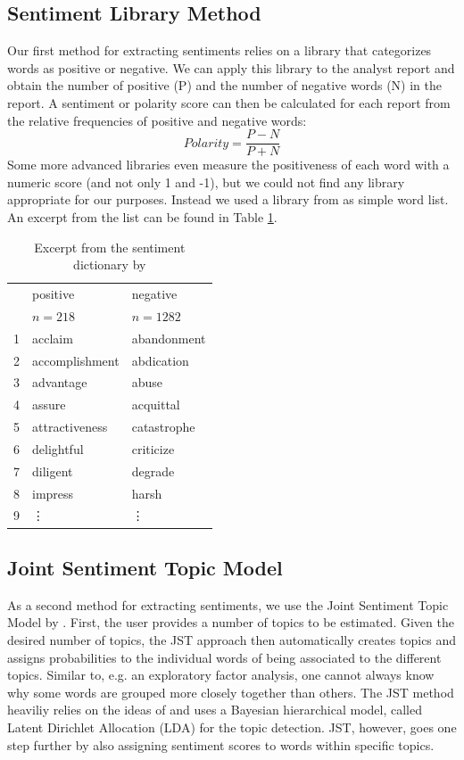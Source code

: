 \subsection{Sentiment Library Method}\label{BoW}
Our first method for extracting sentiments relies on a library that categorizes words as positive or negative. We can apply this library to the analyst report and obtain the number of positive (P) and the number of negative words (N) in the report. A sentiment or polarity score can then be calculated for each report from the relative frequencies of positive and negative words: 
\begin{equation}
    Polarity = \frac{P - N}{P + N}
\end{equation}\label{eq:polarity}
Some more advanced libraries even measure the positiveness of each word with a numeric score (and not only 1 and -1), but we could not find any library appropriate for our purposes. Instead we used a library from \citet{sent_dictionary} as simple word list. An excerpt from the list can be found in Table \ref{tab:sent_dic}. 
\begin{table}[ht]
\centering
\begin{tabular}{rll}
  \hline
 & positive & negative \\ 
 & $n = 218$ & $n = 1282$ \\ 
  \hline
  1 & acclaim & abandonment \\ 
  2 & accomplishment & abdication \\ 
  3 & advantage & abuse \\ 
  4 & assure & acquittal \\ 
  5 & attractiveness & catastrophe \\ 
  6 & delightful & criticize \\ 
  7 & diligent & degrade \\ 
  8 & impress & harsh \\ 
  9 & \vdots & \vdots \\ 
   \hline
\end{tabular}
\caption{Excerpt from the sentiment dictionary by 
\citet{sent_dictionary}}
\label{tab:sent_dic}
\end{table}

\subsection{Joint Sentiment Topic Model}\label{JST}
As a second method for extracting sentiments, we use the Joint Sentiment Topic Model by \citet{lin2009joint}. First, the user provides a number of topics to be estimated. Given the desired number of topics, the JST approach then automatically creates topics and assigns probabilities to the individual words of being associated to the different topics. Similar to, e.g. an exploratory factor analysis, one cannot always know why some words are grouped more closely together than others. The JST method heaviliy relies on the ideas of \citet{blei2003latent} and uses a Bayesian hierarchical model, called Latent Dirichlet Allocation (LDA) for the topic detection. JST, however, goes one step further by also assigning sentiment scores to words within specific topics. 

